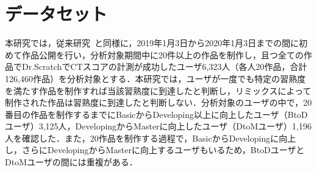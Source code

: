 \documentclass[submit]{ipsj}
\begin{document}




\section{データセット}\label{sec:chapter_3-1}
本研究では，従来研究~\cite{Ando_2021}と同様に，2019年1月3日から2020年1月3日までの間に初めて作品公開を行い，分析対象期間中に20件以上の作品を制作し，且つ全ての作品でDr.ScratchでCTスコアの計測が成功したユーザ6,323人（各人20作品，合計126,460作品）を分析対象とする．本研究では，ユーザが一度でも特定の習熟度を満たす作品を制作すれば当該習熟度に到達したと判断し，リミックスによって制作された作品は習熟度に到達したと判断しない．分析対象のユーザの中で，20番目の作品を制作するまでにBasicからDeveloping以上に向上したユーザ（BtoDユーザ）3,125人，DevelopingからMasterに向上したユーザ（DtoMユーザ）1,196人を確認した．また，20作品を制作する過程で，BasicからDevelopingに向上し，さらにDevelopingからMasterに向上するユーザもいるため，BtoDユーザとDtoMユーザの間には重複がある．
\end{document}
